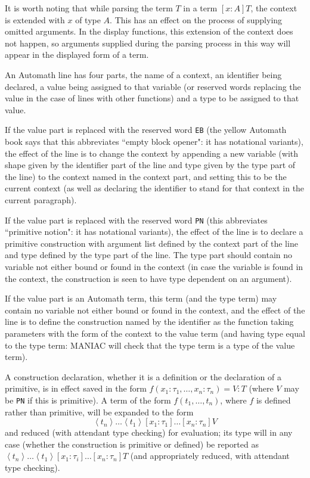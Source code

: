 \documentclass[12pt]{article}
\begin{document}
It is worth noting that while parsing the term $T$ in a term $[x:A]T$, the context is extended with $x$ of type $A$.  This has an effect on the process of supplying omitted arguments.  In the display functions, this extension of the context does not happen, so arguments supplied during the parsing process in this way will appear in the displayed form of a term.

An Automath line has four parts, the name of a context, an identifier being declared, a value being assigned to that variable (or reserved words replacing the value in the case of lines with other functions) and a type to be assigned to that value.

If the value part is replaced with the reserved word {\tt EB} (the yellow Automath book says that this abbreviates ``empty block opener":  it has notational variants), the effect of the line is to change the context by appending a new variable (with shape given by the identifier part of the line and type given by the type part of the line) to the context named in the context part, and setting this to be the current context (as well as declaring the identifier to stand for that context in the current paragraph).

If the value part is replaced with the reserved word {\tt PN} (this abbreviates ``primitive notion":  it has notational variants), the effect of the line is to declare a primitive construction with argument list defined by the context part of the line and type defined by the type part of the line.  The type part should contain no variable not either bound or found in the context (in case the variable is found in the context, the construction is seen to have type dependent on an argument).

If the value part is an Automath term, this term (and the type term) may contain no variable not either bound or found in the context, and the effect of the line is to define
the construction named by the identifier as the function taking parameters with the form of the context to the value term (and having type equal to the type term:  MANIAC will check that the type term is a type of the value term).

A construction declaration, whether it is a definition or the declaration of a primitive, is in effect saved in the form $f(x_1:\tau_1, \ldots,x_n:\tau_n) = V:T$ (where $V$ may be {\tt PN} if this is primitive).  A term of the form
$f(t_1,\ldots,t_n)$, where $f$ is defined rather than primitive, will be expanded to the form $$\left<t_n\right>\ldots\left<t_1\right>[x_1:\tau_1]\ldots[x_n:\tau_n]V$$ and reduced (with attendant type checking) for evaluation;
its type will in any case (whether the construction is primitive or defined) be reported as $\left<t_n\right>\ldots\left<t_1\right>[x_1:\tau_i]\ldots[x_n:\tau_n]T$ (and appropriately reduced, with attendant type checking).
\end{document}
